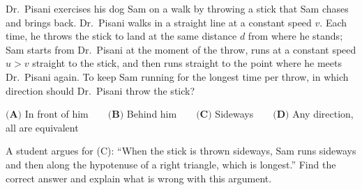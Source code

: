 Dr.~Pisani exercises his dog Sam on a walk by throwing a stick that Sam chases and brings back. Dr.~Pisani walks in a straight line at a constant speed $v$. Each time, he throws the stick to land at the same distance $d$ from where he stands; Sam starts from Dr.~Pisani at the moment of the throw, runs at a constant speed $u>v$ straight to the stick, and then runs straight to the point where he meets Dr.~Pisani again. To keep Sam running for the longest time per throw, in which direction should Dr.~Pisani throw the stick?

$\textbf{(A) }$In front of him$\qquad\textbf{(B) }$Behind him$\qquad\textbf{(C) }$Sideways$\qquad\textbf{(D) }$Any direction, all are equivalent

A student argues for (C): ``When the stick is thrown sideways, Sam runs sideways and then along the hypotenuse of a right triangle, which is longest.'' Find the correct answer and explain what is wrong with this argument.
